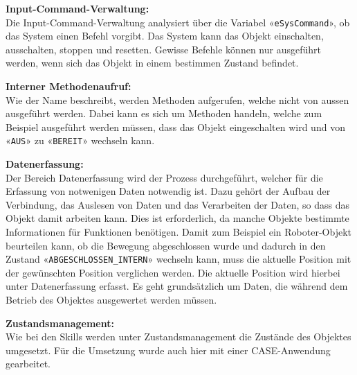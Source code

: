 		\textbf{Input-Command-Verwaltung:}
		\vspace{2mm} 
		\\
		Die Input-Command-Verwaltung analysiert über die Variabel «\verb|eSysCommand|», ob das System einen Befehl vorgibt. Das System kann das Objekt einschalten, ausschalten, stoppen und resetten. Gewisse Befehle können nur ausgeführt werden, wenn sich das Objekt in einem bestimmen Zustand befindet.
		
		\textbf{Interner Methodenaufruf:}
		\vspace{2mm} 
		\\
		Wie der Name beschreibt, werden Methoden aufgerufen, welche nicht von aussen ausgeführt werden. Dabei kann es sich um Methoden handeln, welche zum Beispiel ausgeführt werden müssen, dass das Objekt eingeschalten wird und von «\verb|AUS|» zu «\verb|BEREIT|» wechseln kann.
		
		\textbf{Datenerfassung:}
		\vspace{2mm} 
		\\
		Der Bereich Datenerfassung wird der Prozess durchgeführt, welcher für die Erfassung von notwenigen Daten notwendig ist. Dazu gehört der Aufbau der Verbindung, das Auslesen von Daten und das Verarbeiten der Daten, so dass das Objekt damit arbeiten kann. Dies ist erforderlich, da manche Objekte bestimmte Informationen für Funktionen benötigen. Damit zum Beispiel ein Roboter-Objekt beurteilen kann, ob die Bewegung abgeschlossen wurde und dadurch in den Zustand «\verb|ABGESCHLOSSEN_INTERN|» wechseln kann, muss die aktuelle Position mit der gewünschten Position verglichen werden. Die aktuelle Position wird hierbei unter Datenerfassung erfasst. Es geht grundsätzlich um Daten, die während dem Betrieb des Objektes ausgewertet werden müssen. 
		
		\newpage
		
		\textbf{Zustandsmanagement: }
		\vspace{2mm} 
		\\
		Wie bei den Skills werden unter Zustandsmanagement die Zustände des Objektes umgesetzt. Für die Umsetzung wurde auch hier mit einer CASE-Anwendung gearbeitet.
		
